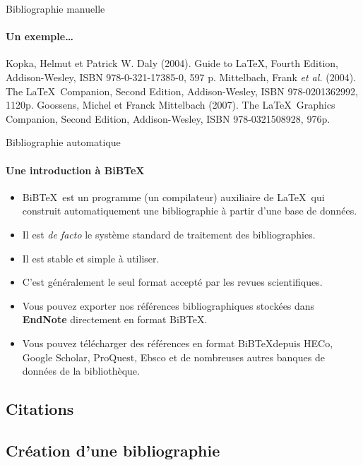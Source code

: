 \begin{frame}[fragile,c]{Bibliographie manuelle}
	\framesubtitle{Un exemple\ldots}
\begin{codesource}
	\begin{thebibliography}{99}		
			Kopka, Helmut et Patrick W. Daly (2004).
			\newblock Guide to \LaTeX, Fourth Edition,
			\newblock Addison-Wesley,
			\newblock ISBN 978-0-321-17385-0, 597 p.
			Mittelbach, Frank \emph{et al.} (2004).
			\newblock The \LaTeX\ Companion, Second Edition,
			\newblock Addison-Wesley,
			\newblock ISBN 978-0201362992, 1120p.
			Goossens, Michel et Franck Mittelbach (2007).
			\newblock The \LaTeX\ Graphics Companion, Second Edition,
			\newblock Addison-Wesley,
			\newblock ISBN 978-0321508928, 976p.
	\end{thebibliography}
\end{codesource}
\end{frame}

\begin{frame}[c]{Bibliographie automatique}
	\framesubtitle{Une introduction à BiB\TeX}
	
	\begin{itemize}
		\item BiB\TeX\ est un programme (un compilateur) auxiliaire de \LaTeX\ qui construit 
			automatiquement une bibliographie à partir d'une base de données.
		\item Il est \emph{de facto} le système standard de traitement des bibliographies.
		\item Il est stable et simple à utiliser.
		\item C'est généralement le seul format accepté par les revues scientifiques.
		\item Vous pouvez exporter nos références bibliographiques stockées dans \textbf{EndNote}
			directement en format BiB\TeX.
		\item Vous pouvez télécharger des références en format BiB\TeX depuis HECo, Google Scholar,
			ProQuest, Ebsco et de nombreuses autres banques de données de la bibliothèque.
	\end{itemize}
\end{frame}

\subsection{Citations}

\subsection{Création d'une bibliographie}